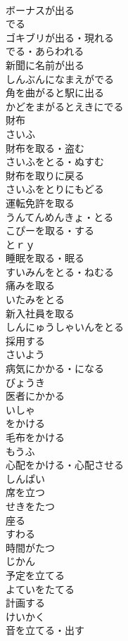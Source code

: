 \documentclass[8pt]{extreport}
\begin{document}
\begin{CJK}{UTF8}{min}
\\	ボーナスが出る	
\\	でる
\\	ゴキブリが出る・現れる	
\\	でる・あらわれる
\\	新聞に名前が出る	
\\	しんぶんになまえがでる
\\	角を曲がると駅に出る	
\\	かどをまがるとえきにでる
\\	財布	
\\	さいふ
\\	財布を取る・盗む	
\\	さいふをとる・ぬすむ
\\	財布を取りに戻る	
\\	さいふをとりにもどる
\\	運転免許を取る	
\\	うんてんめんきょ・とる
\\	こぴーを取る・する	
\\	とｒｙ
\\	睡眠を取る・眠る	
\\	すいみんをとる・ねむる
\\	痛みを取る	
\\	いたみをとる
\\	新入社員を取る	
\\	しんにゅうしゃいんをとる
\\	採用する	
\\	さいよう
\\	病気にかかる・になる	
\\	びょうき
\\	医者にかかる	
\\	いしゃ
\\	をかける	
\\	毛布をかける	
\\	もうふ
\\	心配をかける・心配させる	
\\	しんぱい
\\	席を立つ	
\\	せきをたつ
\\	座る	
\\	すわる
\\	時間がたつ	
\\	じかん
\\	予定を立てる	
\\	よていをたてる
\\	計画する	
\\	けいかく
\\	音を立てる・出す	

\end{CJK}
\end{document}
